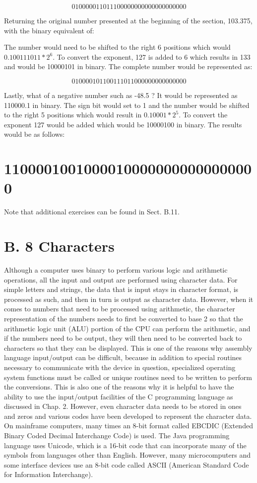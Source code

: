 \documentclass[10pt]{article}
\begin{document}
$$
010000011011100000000000000000000
$$

Returning the original number presented at the beginning of the section, 103.375, with the binary equivalent of:

The number would need to be shifted to the right 6 positions which would $0.100111011 * 2^{6}$. To convert the exponent, 127 is added to 6 which results in 133 and would be 10000101 in binary. The complete number would be represented as:

$$
010000101100111011000000000000000
$$

Lastly, what of a negative number such as -48.5 ? It would be represented as 110000.1 in binary. The sign bit would set to 1 and the number would be shifted to the right 5 positions which would result in $0.10001 * 2^{5}$. To convert the exponent 127 would be added which would be 10000100 in binary. The results would be as follows:

\section*{11000010010000100000000000000000}
Note that additional exercises can be found in Sect. B.11.

\section*{B. 8 Characters}
Although a computer uses binary to perform various logic and arithmetic operations, all the input and output are performed using character data. For simple letters and strings, the data that is input stays in character format, is processed as such, and then in turn is output as character data. However, when it comes to numbers that need to be processed using arithmetic, the character representation of the numbers needs to first be converted to base 2 so that the arithmetic logic unit (ALU) portion of the CPU can perform the arithmetic, and if the numbers need to be output, they will then need to be converted back to characters so that they can be displayed. This is one of the reasons why assembly language input/output can be difficult, because in addition to special routines necessary to communicate with the device in question, specialized operating system functions must be called or unique routines need to be written to perform the conversions. This is also one of the reasons why it is helpful to have the ability to use the input/output facilities of the C programming language as discussed in Chap. 2. However, even character data needs to be stored in ones and zeros and various codes have been developed to represent the character data. On mainframe computers, many times an 8-bit format called EBCDIC (Extended Binary Coded Decimal Interchange Code) is used. The Java programming language uses Unicode, which is a 16-bit code that can incorporate many of the symbols from languages other than English. However, many microcomputers and some interface devices use an 8-bit code called ASCII (American Standard Code for Information Interchange).
\end{document}
